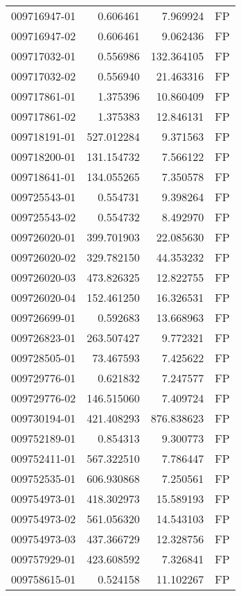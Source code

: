 \begin{tabular}{lrrl}
009716947-01 &    0.606461 &     7.969924 &   FP \\
009716947-02 &    0.606461 &     9.062436 &   FP \\
009717032-01 &    0.556986 &   132.364105 &   FP \\
009717032-02 &    0.556940 &    21.463316 &   FP \\
009717861-01 &    1.375396 &    10.860409 &   FP \\
009717861-02 &    1.375383 &    12.846131 &   FP \\
009718191-01 &  527.012284 &     9.371563 &   FP \\
009718200-01 &  131.154732 &     7.566122 &   FP \\
009718641-01 &  134.055265 &     7.350578 &   FP \\
009725543-01 &    0.554731 &     9.398264 &   FP \\
009725543-02 &    0.554732 &     8.492970 &   FP \\
009726020-01 &  399.701903 &    22.085630 &   FP \\
009726020-02 &  329.782150 &    44.353232 &   FP \\
009726020-03 &  473.826325 &    12.822755 &   FP \\
009726020-04 &  152.461250 &    16.326531 &   FP \\
009726699-01 &    0.592683 &    13.668963 &   FP \\
009726823-01 &  263.507427 &     9.772321 &   FP \\
009728505-01 &   73.467593 &     7.425622 &   FP \\
009729776-01 &    0.621832 &     7.247577 &   FP \\
009729776-02 &  146.515060 &     7.409724 &   FP \\
009730194-01 &  421.408293 &   876.838623 &   FP \\
009752189-01 &    0.854313 &     9.300773 &   FP \\
009752411-01 &  567.322510 &     7.786447 &   FP \\
009752535-01 &  606.930868 &     7.250561 &   FP \\
009754973-01 &  418.302973 &    15.589193 &   FP \\
009754973-02 &  561.056320 &    14.543103 &   FP \\
009754973-03 &  437.366729 &    12.328756 &   FP \\
009757929-01 &  423.608592 &     7.326841 &   FP \\
009758615-01 &    0.524158 &    11.102267 &   FP \\

\end{tabular}
